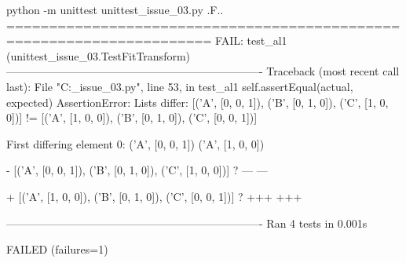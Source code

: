 python -m unittest unittest_issue_03.py
.F..
======================================================================
FAIL: test_al1 (unittest_issue_03.TestFitTransform)
----------------------------------------------------------------------
Traceback (most recent call last):
  File "C:\Users{}\unittest_issue_03.py", line 53, in test_al1
    self.assertEqual(actual, expected)
AssertionError: Lists differ: [('A', [0, 0, 1]), ('B', [0, 1, 0]), ('C', [1, 0, 0])] != [('A', [1, 0, 0]), ('B', [0, 1, 0]), ('C', [0, 0, 1])]

First differing element 0:
('A', [0, 0, 1])
('A', [1, 0, 0])

- [('A', [0, 0, 1]), ('B', [0, 1, 0]), ('C', [1, 0, 0])]
?             ---                             ---

+ [('A', [1, 0, 0]), ('B', [0, 1, 0]), ('C', [0, 0, 1])]
?         +++                                     +++


----------------------------------------------------------------------
Ran 4 tests in 0.001s

FAILED (failures=1)